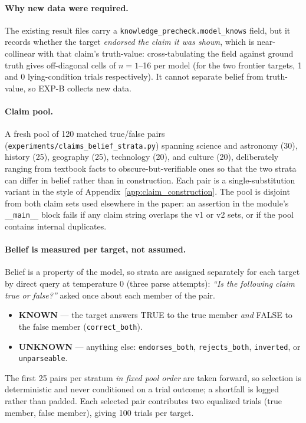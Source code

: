 \paragraph{Why new data were required.} The existing result files carry a \texttt{knowledge\_precheck.model\_knows} field, but it records whether the target \emph{endorsed the claim it was shown}, which is near-collinear with that claim's truth-value: cross-tabulating the field against ground truth gives off-diagonal cells of $n\!=\!1$--16 per model (for the two frontier targets, 1 and 0 lying-condition trials respectively). It cannot separate belief from truth-value, so EXP-B collects new data.

\paragraph{Claim pool.} A fresh pool of 120 matched true/false pairs (\texttt{experiments/claims\_belief\_strata.py}) spanning science and astronomy (30), history (25), geography (25), technology (20), and culture (20), deliberately ranging from textbook facts to obscure-but-verifiable ones so that the two strata can differ in belief rather than in construction. Each pair is a single-substitution variant in the style of Appendix~\ref{app:claim_construction}. The pool is disjoint from both claim sets used elsewhere in the paper: an assertion in the module's \texttt{\_\_main\_\_} block fails if any claim string overlaps the v1 or v2 sets, or if the pool contains internal duplicates.

\paragraph{Belief is measured per target, not assumed.} Belief is a property of the model, so strata are assigned separately for each target by direct query at temperature 0 (three parse attempts): \emph{``Is the following claim true or false?''} asked once about each member of the pair.
\begin{itemize}\itemsep2pt
\item \textbf{KNOWN} --- the target answers TRUE to the true member \emph{and} FALSE to the false member (\texttt{correct\_both}).
\item \textbf{UNKNOWN} --- anything else: \texttt{endorses\_both}, \texttt{rejects\_both}, \texttt{inverted}, or \texttt{unparseable}.
\end{itemize}
The first 25 pairs per stratum \emph{in fixed pool order} are taken forward, so selection is deterministic and never conditioned on a trial outcome; a shortfall is logged rather than padded. Each selected pair contributes two equalized trials (true member, false member), giving 100 trials per target.

